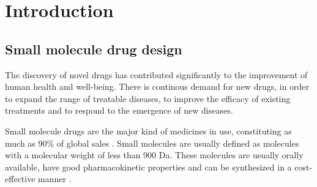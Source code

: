 \chapter{Introduction\label{chap:introduction}}

\section{Small molecule drug design\label{sec:drug-design}}
The discovery of novel drugs has contributed significantly to the improvement of human health and
well-being. There is continous demand for new drugs, in order to expand the range of treatable
diseases, to improve the efficacy of existing treatments and to respond to the emergence of new
diseases.

Small molecule drugs are the major kind of medicines in use, constituting as much as 90\% of global
sales \citep{makurvetBiologicsVsSmall2021}. Small molecules are usually defined as molecules with a
molecular weight of less than 900 Da. These molecules are usually orally available, have good
pharmacokinetic properties and can be synthesized in a cost-effective manner \citep{todo}.

